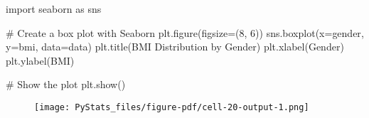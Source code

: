 \documentclass[
  letterpaper,
  DIV=11,
  numbers=noendperiod]{scrartcl}
\newenvironment{Shaded}{\begin{snugshade}}{\end{snugshade}}
\newcommand{\CommentTok}[1]{\textcolor[rgb]{0.37,0.37,0.37}{#1}}
\newcommand{\DecValTok}[1]{\textcolor[rgb]{0.68,0.00,0.00}{#1}}
\newcommand{\ImportTok}[1]{\textcolor[rgb]{0.00,0.46,0.62}{#1}}
\newcommand{\NormalTok}[1]{\textcolor[rgb]{0.00,0.23,0.31}{#1}}
\newcommand{\OperatorTok}[1]{\textcolor[rgb]{0.37,0.37,0.37}{#1}}
\newcommand{\StringTok}[1]{\textcolor[rgb]{0.13,0.47,0.30}{#1}}
\begin{document}
\begin{Shaded}
\begin{Highlighting}[]
\ImportTok{import}\NormalTok{ seaborn }\ImportTok{as}\NormalTok{ sns}

\CommentTok{\# Create a box plot with Seaborn}
\NormalTok{plt.figure(figsize}\OperatorTok{=}\NormalTok{(}\DecValTok{8}\NormalTok{, }\DecValTok{6}\NormalTok{))}
\NormalTok{sns.boxplot(x}\OperatorTok{=}\StringTok{\textquotesingle{}gender\textquotesingle{}}\NormalTok{, y}\OperatorTok{=}\StringTok{\textquotesingle{}bmi\textquotesingle{}}\NormalTok{, data}\OperatorTok{=}\NormalTok{data)}
\NormalTok{plt.title(}\StringTok{\textquotesingle{}BMI Distribution by Gender\textquotesingle{}}\NormalTok{)}
\NormalTok{plt.xlabel(}\StringTok{\textquotesingle{}Gender\textquotesingle{}}\NormalTok{)}
\NormalTok{plt.ylabel(}\StringTok{\textquotesingle{}BMI\textquotesingle{}}\NormalTok{)}

\CommentTok{\# Show the plot}
\NormalTok{plt.show()}
\end{Highlighting}
\end{Shaded}

\begin{figure}[H]

{\centering \texttt{[image: PyStats\_files/figure-pdf/cell-20-output-1.png]}

}

\end{figure}
\end{document}
